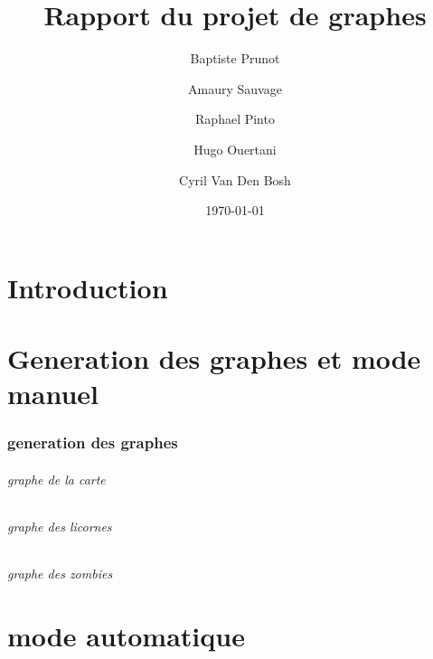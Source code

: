 \documentclass{report}
\title{Rapport du projet de graphes}
\author{Baptiste Prunot
\and Amaury Sauvage
\and Raphael Pinto
\and Hugo Ouertani
\and Cyril Van Den Bosh}
\date{\today}
\begin{document}
	\maketitle

	\part*{Introduction} 
	
	\part{Generation des graphes et mode manuel}
		\section{generation des graphes}
			\paragraph{graphe de la carte}
			\paragraph{graphe des licornes}
			\paragraph{graphe des zombies}
	\part{mode automatique}
	
\end{document}
